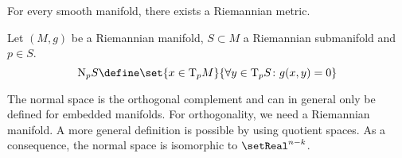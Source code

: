 \documentclass{stdlocal}
\begin{document}
\begin{theorem}
  For every smooth manifold, there exists a Riemannian metric.
\end{theorem}

\begin{definition}
  Let $(M,g)$ be a Riemannian manifold, $S\subset M$ a Riemannian submanifold and $p\in S$.
  \[
    \mathrm{N}_pS \define \set{x\in \mathrm{T}_pM}{\forall y\in\mathrm{T}_pS\colon g(x,y)=0}
  \]
\end{definition}
The normal space is the orthogonal complement and can in general only be defined for embedded manifolds.
For orthogonality, we need a Riemannian manifold.
A more general definition is possible by using quotient spaces.
As a consequence, the normal space is isomorphic to $\setReal^{n-k}$.

\end{document}
